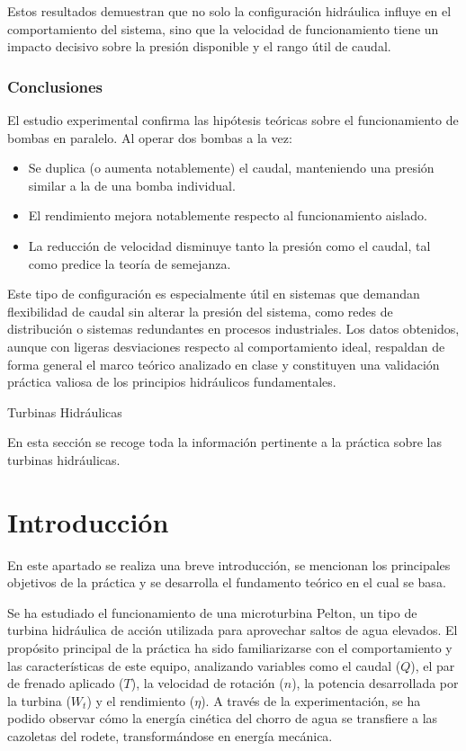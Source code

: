 \documentclass[10pt]{IEEEtran}
\begin{document}
Estos resultados demuestran que no solo la configuración hidráulica influye en el comportamiento del sistema, sino que la velocidad de funcionamiento tiene un impacto decisivo sobre la presión disponible y el rango útil de caudal.

\subsubsection{Conclusiones}
El estudio experimental confirma las hipótesis teóricas sobre el funcionamiento de bombas en paralelo. Al operar dos bombas a la vez:

\begin{itemize}
    \item Se duplica (o aumenta notablemente) el caudal, manteniendo una presión similar a la de una bomba individual.
    \item El rendimiento mejora notablemente respecto al funcionamiento aislado.
    \item La reducción de velocidad disminuye tanto la presión como el caudal, tal como predice la teoría de semejanza.
\end{itemize}

Este tipo de configuración es especialmente útil en sistemas que demandan flexibilidad de caudal sin alterar la presión del sistema, como redes de distribución o sistemas redundantes en procesos industriales. Los datos obtenidos, aunque con ligeras desviaciones respecto al comportamiento ideal, respaldan de forma general el marco teórico analizado en clase y constituyen una validación práctica valiosa de los principios hidráulicos fundamentales.

\onecolumn
\newpage
\twocolumn
{\LARGE Turbinas Hidráulicas \par}
\setcounter{section}{0}
\setcounter{subsection}{0}
\setcounter{subsubsection}{0}

En esta sección se recoge toda la información pertinente a la práctica sobre las turbinas hidráulicas.

\section{Introducción}
En este apartado se realiza una breve introducción, se mencionan los principales objetivos de la práctica y se desarrolla el fundamento teórico en el cual se basa.

Se ha estudiado el funcionamiento de una microturbina Pelton, un tipo de turbina hidráulica de acción utilizada para aprovechar saltos de agua elevados. El propósito principal de la práctica ha sido familiarizarse con el comportamiento y las características de este equipo, analizando variables como el caudal ($Q$), el par de frenado aplicado ($T$), la velocidad de rotación ($n$), la potencia desarrollada por la turbina ($W_t$) y el rendimiento ($\eta$). A través de la experimentación, se ha podido observar cómo la energía cinética del chorro de agua se transfiere a las cazoletas del rodete, transformándose en energía mecánica.
\end{document}
